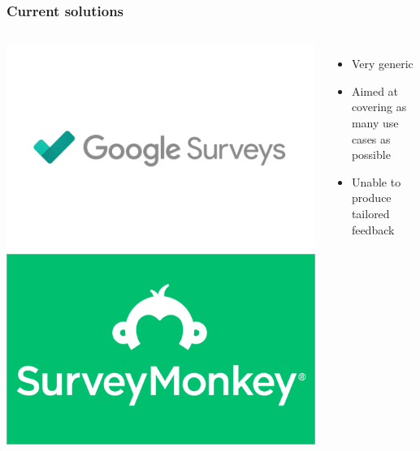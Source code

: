 \documentclass{beamer}
\begin{document}
\begin{frame}
    \frametitle{Current solutions}
    \begin{columns}
        \includegraphics[height=.35\textheight]{images/Google-Surveys-logo.png}
        \includegraphics[height=.35\textheight]{images/2017-surveymonkey-new-logo-design-4.png}

        \begin{itemize}
            \pause
            \item Very generic 
            \pause
            \vspace{.2cm}
            \item Aimed at covering as many use cases as possible
            \pause
            \vspace{.2cm} 
            \item Unable to produce tailored feedback
        \end{itemize}
    \end{columns}
\end{frame}
\end{document}
